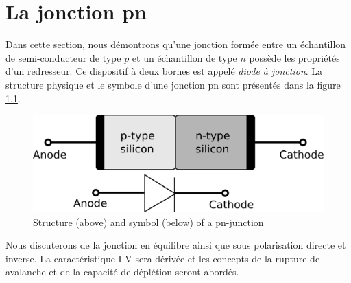 \chapter{La jonction pn}
\label{ch:pnjunction}

Dans cette section, nous démontrons qu'une jonction formée entre un échantillon de semi-conducteur de type $p$ et un échantillon de type $n$ possède les propriétés d'un redresseur. Ce dispositif à deux bornes est appelé \emph{diode à jonction}. La structure physique et le symbole d'une jonction pn sont présentés dans la figure \ref{fig:pnjunction}.

\begin{figure}[h!]
\centering
\includegraphics[width=12cm]{figures/ch01/pnjunction.png}
\caption{Structure (above) and symbol (below) of a pn-junction} 
\label{fig:pnjunction}
\end{figure}

Nous discuterons de la jonction en équilibre ainsi que sous polarisation directe et inverse. La caractéristique I-V sera dérivée et les concepts de la rupture de avalanche et de la capacité de déplétion seront abordés.

